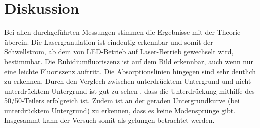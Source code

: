 \newpage
\section{Diskussion}
\label{sec:Diskussion}
Bei allen durchgeführten Messungen stimmen die Ergebnisse mit der Theorie überein.
Die Lasergranulation ist eindeutig erkennbar und somit der Schwellstrom, ab dem von LED-Betrieb auf Laser-Betrieb gewechselt wird, bestimmbar.
Die Rubidiumfluoriszenz ist auf dem Bild erkennbar, auch wenn nur eine leichte Fluoriszenz auftritt.
Die Absorptionslinien hingegen sind sehr deutlich zu erkennen. 
Durch den Verglech zwischen unterdrücktem Untergrund und nicht unterdrücktem Untergrund ist gut zu sehen , dass die Unterdrückung mithilfe des 50/50-Teilers erfolgreich ist.
Zudem ist an der geraden Untergrundkurve (bei unterdrücktem Untergrund) zu erkennen, dass es keine Modensprünge gibt.
Insgesammt kann der Versuch somit als gelungen betrachtet werden.